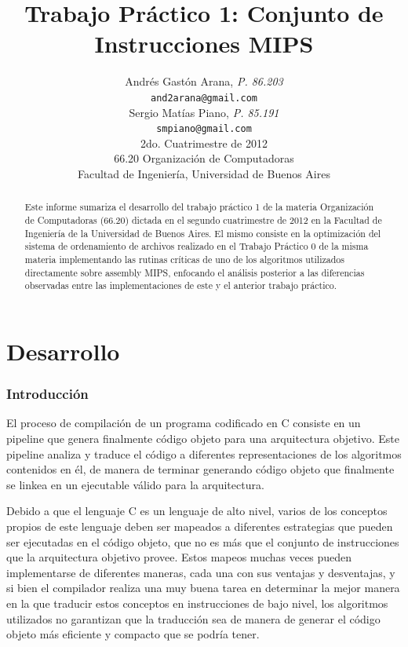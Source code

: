 \documentclass[a4paper,11pt]{article}
\title{\textbf{Trabajo Práctico 1: Conjunto de Instrucciones MIPS}}
\author{
  Andrés Gastón Arana, \textit{P. 86.203}                          \\
  \texttt{and2arana@gmail.com}                                     \\
  Sergio Matías Piano, \textit{P. 85.191}                          \\
  \texttt{smpiano@gmail.com}                                       \\ [2.5ex]
  \normalsize{2do. Cuatrimestre de 2012}                           \\
  \normalsize{66.20 Organización de Computadoras}                  \\
  \normalsize{Facultad de Ingeniería, Universidad de Buenos Aires}
}
\date{}
\begin{document}
\thispagestyle{empty}
\maketitle

\begin{abstract}

  Este informe sumariza el desarrollo del trabajo práctico 1 de la materia
  Organización de Computadoras (66.20) dictada en el segundo cuatrimestre de
  2012 en la Facultad de Ingeniería de la Universidad de Buenos Aires. El mismo
  consiste en la optimización del sistema de ordenamiento de archivos realizado
  en el Trabajo Práctico 0 de la misma materia implementando las rutinas
  críticas de uno de los algoritmos utilizados directamente sobre assembly
  MIPS, enfocando el análisis posterior a las diferencias observadas entre las
  implementaciones de este y el anterior trabajo práctico.

\end{abstract}

\clearpage

\tableofcontents
\clearpage


\part{Desarrollo}

\section{Introducción}

El proceso de compilación de un programa codificado en C consiste en un
pipeline que genera finalmente código objeto para una arquitectura objetivo.
Este pipeline analiza y traduce el código a diferentes representaciones de los
algoritmos contenidos en él, de manera de terminar generando código objeto que
finalmente se linkea en un ejecutable válido para la arquitectura.

Debido a que el lenguaje C es un lenguaje de alto nivel, varios de los
conceptos propios de este lenguaje deben ser mapeados a diferentes estrategias
que pueden ser ejecutadas en el código objeto, que no es más que el conjunto de
instrucciones que la arquitectura objetivo provee. Estos mapeos muchas veces
pueden implementarse de diferentes maneras, cada una con sus ventajas y
desventajas, y si bien el compilador realiza una muy buena tarea en determinar
la mejor manera en la que traducir estos conceptos en instrucciones de bajo
nivel, los algoritmos utilizados no garantizan que la traducción sea de manera
de generar el código objeto más eficiente y compacto que se podría tener.
\end{document}
